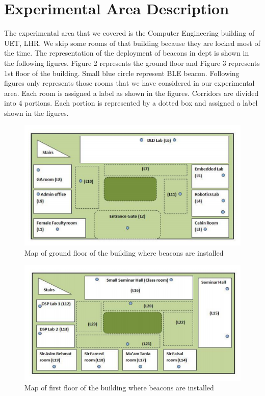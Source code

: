 \section {Experimental Area Description}
The experimental area that we covered is the Computer Engineering building of UET, LHR. We skip some rooms of that building because they are locked most of the time. The representation of the deployment of beacons in dept is shown in the following figures. Figure 2 represents the ground floor and Figure 3 represents 1st floor of the building. Small blue circle represent BLE beacon. Following figures only represents those rooms that we have considered in our experimental area. Each room is assigned a label as shown in the figures. Corridors are divided into 4 portions. Each portion is represented by a dotted box and assigned a label shown in the figures. 
\begin{figure}[h]
  		\centering
    		\includegraphics{./Figures/2}
\caption{Map of ground floor of the building where beacons are installed}
\label{fig:2}
 		\end{figure}
    \begin{figure}[h]
  		\centering
    		\includegraphics{./Figures/3}
\caption{Map of first floor of the building where beacons are installed}
\label{fig:3}
 		\end{figure}

